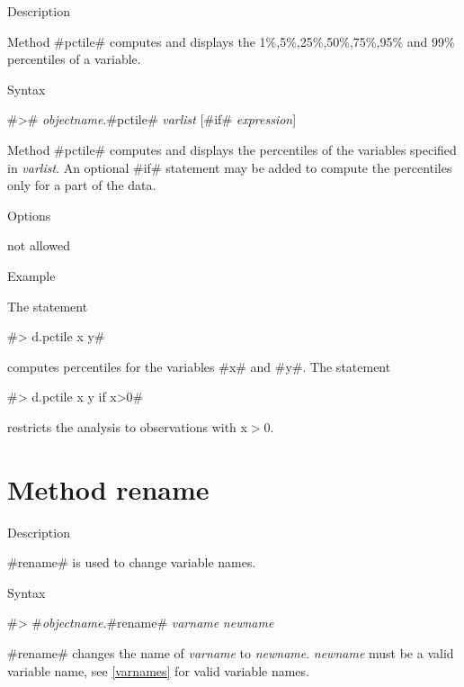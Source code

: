 \begin{stanza}{Description}

{Method #pctile# computes and displays the
1\%,5\%,25\%,50\%,75\%,95\% and 99\%  percentiles of a variable.}
\end{stanza}

\begin{stanza}{Syntax}

{#># {\em objectname}.#pctile# {\em varlist} [#if# {\em expression}]

Method #pctile# computes and displays the percentiles of the
variables specified in {\em varlist}. An optional #if# statement
may be added to compute the percentiles only for a part of the
data.}
\end{stanza}

\begin{stanza}{Options}

{not allowed}
\end{stanza}


\begin{stanza}{Example}

{The statement

#> d.pctile x y#

computes percentiles for the variables #x# and #y#.
The statement

#> d.pctile x y if x>0#

restricts the analysis to observations with x$>$0.}
\end{stanza}



\clearpage



\section{Method rename}
 


\label{rename}


\begin{stanza}{Description}

{#rename# is used to change variable names.}
\end{stanza}


\begin{stanza}{Syntax}

{#> #{\em objectname}.#rename# {\em varname} {\em newname}

#rename# changes the name of {\em varname} to {\em newname}. {\em
newname} must be a valid variable name, see \autoref{varnames} for
valid variable names.}
\end{stanza}

